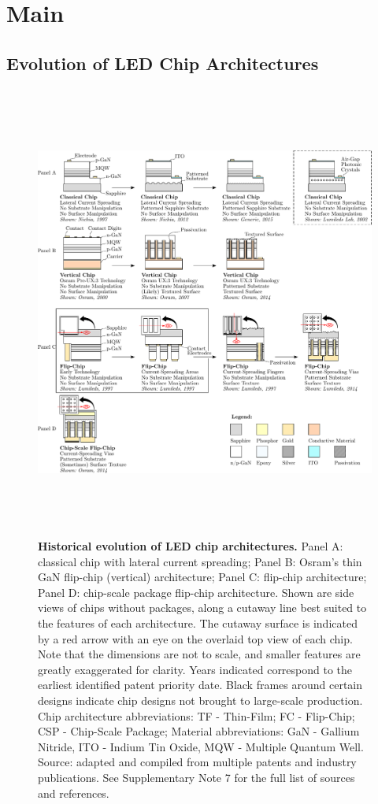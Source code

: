 \documentclass[parskip=full]{article}
\begin{document}
\section{Main}

\subsection{Evolution of LED Chip Architectures}

\clearpage
\begin{figure}[h!]
\centering
\includegraphics[height=15cm]{figures/chip_architecture_overview.pdf}
\caption{\textbf{Historical evolution of LED chip architectures.} Panel A: classical chip with lateral current spreading; Panel B: Osram’s thin GaN flip-chip (vertical) architecture; Panel C: flip-chip architecture; Panel D: chip-scale package flip-chip architecture. Shown are side views of chips without packages, along a cutaway line best suited to the features of each architecture. The cutaway surface is indicated by a red arrow with an eye on the overlaid top view of each chip. Note that the dimensions are not to scale, and smaller features are greatly exaggerated for clarity. Years indicated correspond to the earliest identified patent priority date. Black frames around certain designs indicate chip designs not brought to large-scale production. Chip architecture abbreviations: TF - Thin-Film; FC - Flip-Chip; CSP - Chip-Scale Package; Material abbreviations: GaN - Gallium Nitride, ITO - Indium Tin Oxide, MQW - Multiple Quantum Well. Source: adapted and compiled from multiple patents and industry publications. See Supplementary Note 7 for the full list of sources and references.}
\label{fgr:chip_architecture_overview}
\end{figure}
\end{document}
